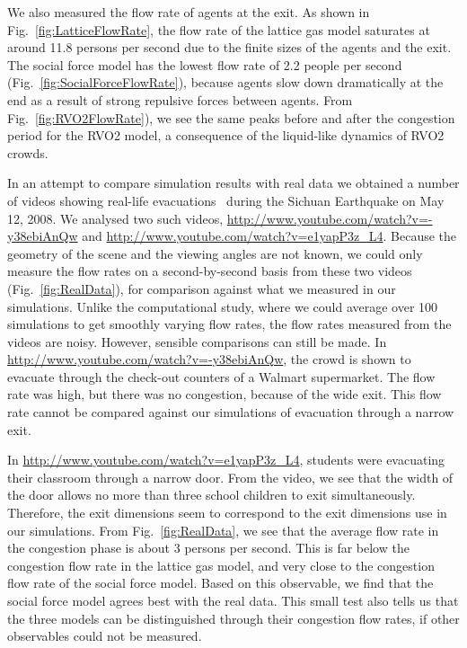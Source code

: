 We also measured the flow rate of agents at the exit. As shown in Fig.~\ref{fig:LatticeFlowRate}, the flow rate of the lattice gas model saturates at around 11.8 persons per second due to the finite sizes of the agents and the exit. The social force model has the lowest flow rate of 2.2 people per second (Fig.~\ref{fig:SocialForceFlowRate}), because agents slow down dramatically at the end as a result of strong repulsive forces between agents. From Fig.~\ref{fig:RVO2FlowRate}), we see the same peaks before and after the congestion period for the RVO2 model, a consequence of the liquid-like dynamics of RVO2 crowds.

In an attempt to compare simulation results with real data we obtained a number of videos showing real-life evacuations~\cite{Yang2013,Yang2011} during the Sichuan Earthquake on May 12, 2008. We analysed two such videos, \url{http://www.youtube.com/watch?v=-y38ebiAnQw} and \url{http://www.youtube.com/watch?v=e1yapP3z_L4}.
Because the geometry of the scene and the viewing angles are not known, we could only measure the flow rates on a second-by-second basis from these two videos (Fig.~\ref{fig:RealData}), for comparison against what we measured in our simulations. Unlike the computational study, where we could average over 100 simulations to get smoothly varying flow rates, the flow rates measured from the videos are noisy. However, sensible comparisons can still be made. In \url{http://www.youtube.com/watch?v=-y38ebiAnQw}, the crowd is shown to evacuate through the check-out counters of a Walmart supermarket. The flow rate was high, but there was no congestion, because of the wide exit. This flow rate cannot be compared against our simulations of evacuation through a narrow exit.

In \url{http://www.youtube.com/watch?v=e1yapP3z_L4}, students were evacuating their classroom through a narrow door. From the video, we see that the width of the door allows no more than three school children to exit simultaneously. Therefore, the exit dimensions seem to correspond to the exit dimensions use in our simulations. From Fig.~\ref{fig:RealData}, we see that the average flow rate in the congestion phase is about 3 persons per second. This is far below the congestion flow rate in the lattice gas model, and very close to the congestion flow rate of the social force model. Based on this observable, we find that the social force model agrees best with the real data. This small test also tells us that the three models can be distinguished through their congestion flow rates, if other observables could not be measured.



